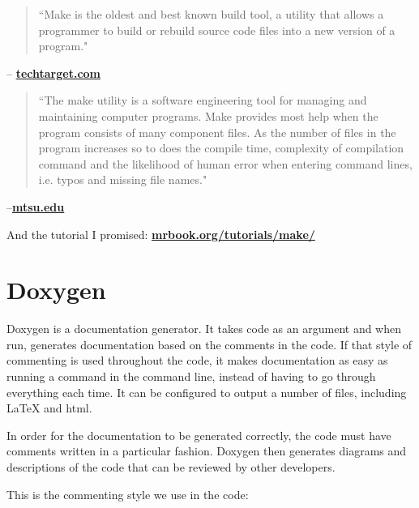 \documentclass{report}
\begin{document}
\begin{appendices}
\begin{quote}
``Make is the oldest and best known build tool, a utility that allows a programmer to build or rebuild source code files into a new version of a program."
\end{quote}
\hfill -- \href{http://whatis.techtarget.com/definition/make}{\textbf{techtarget.com}}

\begin{quote}
``The make utility is a software engineering tool for managing and maintaining computer programs. Make provides most help when the program consists of many component files. As the number of files in the program increases so to does the compile time, complexity of compilation command and the likelihood of human error when entering command lines, i.e. typos and missing file names."
\end{quote}
\hfill --\href{http://capone.mtsu.edu/csdept/FacilitiesAndResources/make.htm#What%20make}
{\textbf{mtsu.edu}}

And the tutorial I promised: \href{http://mrbook.org/tutorials/make/}{\textbf{mrbook.org/tutorials/make/}}
\newpage

\section{Doxygen} \label{app:doxy}
Doxygen is a documentation generator. It takes code as an argument and when run, generates documentation based on the comments in the code. If that style of commenting is used throughout the code, it makes documentation as easy as running a command in the command line, instead of having to go through everything each time. It can be configured to output a number of files, including \LaTeX\hspace*{.25pt} and html.

In order for the documentation to be generated correctly, the code must have comments written in a particular fashion. Doxygen then generates diagrams and descriptions of the code that can be reviewed by other developers.


This is the commenting style we use in the code:\\

\begin{center}
\end{center}
\end{appendices}
\end{document}
